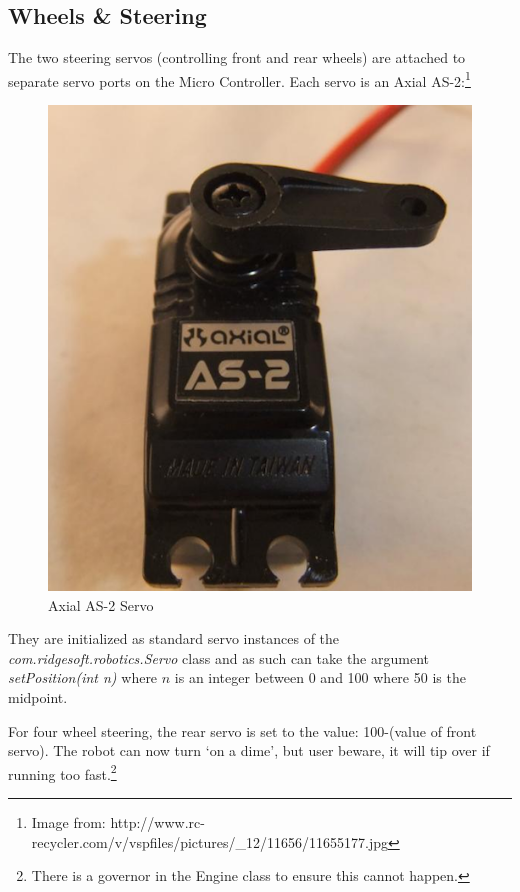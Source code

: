 \documentclass[12pt]{article}
\begin{document}
\subsection{Wheels \& Steering}
The two steering servos (controlling front and rear wheels) are attached to separate servo ports on the Micro Controller.  Each servo is an Axial AS-2:\footnote{Image from: http://www.rc-recycler.com/v/vspfiles/pictures/\_12/11656/11655177.jpg}
\begin{figure}[h]
\centerline{\includegraphics[scale=.75, angle=270]{img/as2}}
\caption{Axial AS-2 Servo}
\end{figure}

They are initialized as standard servo instances of the \textit{com.ridgesoft.robotics.Servo} class and as such can take the argument \textit{setPosition(int n)} where $n$ is an integer between 0 and 100 where 50 is the midpoint.

For four wheel steering, the rear servo is set to the value: 100-(value of front servo).  The robot can now turn `on a dime', but user beware, it will tip over if running too fast.\footnote{There is a governor in the Engine class to ensure this cannot happen.} 
\end{document}
